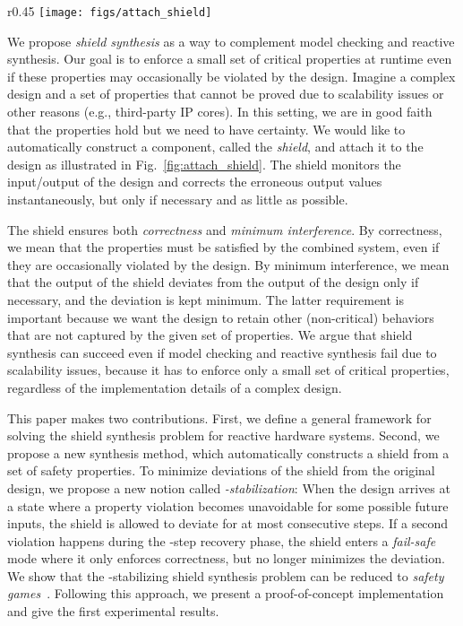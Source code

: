 \documentclass{llncs}
\begin{document}
\begin{wrapfigure}[7]{r}{0.45\textwidth}
\vspace{-0.6cm}
\texttt{[image: figs/attach\_shield]}
\caption{Attaching a safety shield.\\}
\label{fig:attach_shield}
\end{wrapfigure}

We propose \emph{shield synthesis} as a way to complement model checking 
and reactive synthesis.  Our goal is to enforce a small set of critical 
properties at runtime even if these properties may occasionally be 
violated by the design.  Imagine a complex design and a set of 
properties that cannot be proved due to scalability issues or other 
reasons (e.g., third-party IP cores). In this setting, we are in good 
faith that the properties hold but we need to have certainty.  We would 
like to automatically construct a component, called the \emph{shield}, 
and attach it to the design as illustrated in 
Fig.~\ref{fig:attach_shield}. The shield monitors the input/output of 
the design and corrects the erroneous output values instantaneously, but 
only if necessary and as little as possible.

The shield ensures both \emph{correctness} and \emph{minimum 
interference}.  By correctness, we mean that the properties must be 
satisfied by the combined system, even if they are occasionally violated 
by the design.  By minimum interference, we mean that the output of the 
shield deviates from the output of the design only if necessary, and the 
deviation is kept minimum.  The latter requirement is important because 
we want the design to retain other (non-critical) behaviors that are not 
captured by the given set of properties.  We argue that shield synthesis 
can succeed even if model checking and reactive synthesis fail due to 
scalability issues, because it has to enforce only a small set of 
critical properties, regardless of the implementation details of a 
complex design. 

This paper makes two contributions. First, we define a general framework 
for solving the shield synthesis problem for reactive hardware systems. 
Second, we propose a new synthesis method, which automatically 
constructs a shield from a set of safety properties. To minimize 
deviations of the shield from the original design, we propose a new 
notion called \emph{-stabilization}:  When the design arrives at a 
state where a property violation becomes unavoidable for some possible 
future inputs, the shield is allowed to deviate for at most  
consecutive steps.  If a second violation happens during the -step 
recovery phase, the shield enters a \emph{fail-safe} mode where it only 
enforces correctness, but no longer minimizes the deviation. We show 
that the -stabilizing shield synthesis problem can be reduced to 
\emph{safety games}~\cite{Mazala01}. Following this approach, we present a 
proof-of-concept implementation and give the first experimental 
results.
\end{document}
